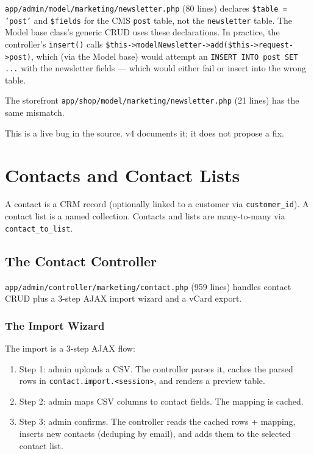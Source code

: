 \documentclass[11pt,a4paper]{article}
\begin{document}
\begin{findingbox}
\texttt{app/admin/model/marketing/newsletter.php} (80 lines)
declares \texttt{\$table = 'post'} and \texttt{\$fields} for the
CMS \texttt{post} table, not the \texttt{newsletter} table. The
Model base class's generic CRUD uses these declarations. In
practice, the controller's \texttt{insert()} calls
\texttt{\$this->modelNewsletter->add(\$this->request->post)},
which (via the Model base) would attempt an
\texttt{INSERT INTO post SET ...} with the newsletter fields ---
which would either fail or insert into the wrong table.

The storefront \texttt{app/shop/model/marketing/newsletter.php}
(21 lines) has the same mismatch.

This is a live bug in the source. v4 documents it; it does not
propose a fix.
\end{findingbox}

\section{Contacts and Contact Lists}\label{sec:contacts}

A contact is a CRM record (optionally linked to a customer via
\texttt{customer\_id}). A contact list is a named collection.
Contacts and lists are many-to-many via
\texttt{contact\_to\_list}.

\subsection{The Contact Controller}

\texttt{app/admin/controller/marketing/contact.php} (959 lines)
handles contact CRUD plus a 3-step AJAX import wizard and a vCard
export.

\subsubsection{The Import Wizard}

The import is a 3-step AJAX flow:

\begin{enumerate}[leftmargin=1.6em,itemsep=2pt]
  \item Step 1: admin uploads a CSV. The controller parses it,
        caches the parsed rows in \texttt{contact.import.<session>},
        and renders a preview table.
  \item Step 2: admin maps CSV columns to contact fields. The
        mapping is cached.
  \item Step 3: admin confirms. The controller reads the cached
        rows + mapping, inserts new contacts (deduping by email),
        and adds them to the selected contact list.
\end{enumerate}
\end{document}
